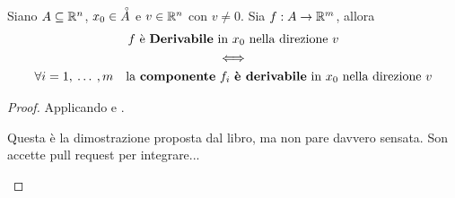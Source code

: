 \begin{proposition}
	Siano $A \subseteq \mathbb{R}^n$, $x_0 \in \accentset{\circ}{A}$ e $v \in \mathbb{R}^n$ con $v \neq 0$. Sia $f: A \to \mathbb{R}^m$, allora
	\begin{equation*}
		\begin{gathered}
			f \text{ è \textbf{Derivabile} in $x_0$ nella direzione $v$}\\
			\iff\\
			\forall i = 1,\:\dotsc\:,m \quad \text{la \textbf{componente} $f_i$ \textbf{è derivabile} in $x_0$ nella direzione $v$}
		\end{gathered}
	\end{equation*}
	\begin{proof}
		Applicando  e .
		\begin{note}
			Questa è la dimostrazione proposta dal libro, ma non pare davvero sensata. Son accette pull request per integrare...
		\end{note}
	\end{proof}
\end{proposition}
